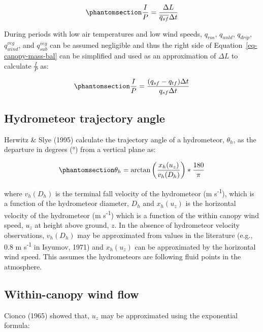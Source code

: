 \documentclass[
  letterpaper,
  DIV=11,
  numbers=noendperiod]{scrartcl}
\begin{document}
\begin{equation}\phantomsection\label{eq-ip}{
\frac{I}{P} = \frac{\Delta L}{\overline{q_{sf}} \Delta t}
}\end{equation}

During periods with low air temperatures and low wind speeds,
\(q_{ros}\), \(q_{unld}\), \(q_{drip}\), \(q_{wind}^{veg}\), and
\(q_{sub}^{veg}\) can be assumed negligible and thus the right side of
Equation~\ref{eq-canopy-mass-bal} can be simplified and used as an
approximation of \(\Delta L\) to calculate \(\frac{I}{P}\) as:

\begin{equation}\phantomsection\label{eq-ip2}{
\frac{I}{P} = \frac{(q_{sf} - q_{tf})\Delta t}{q_{sf} \Delta t}
}\end{equation}

\subsection{Hydrometeor trajectory
angle}\label{hydrometeor-trajectory-angle}

Herwitz \& Slye (1995) calculate the trajectory angle of a hydrometeor,
\(\theta_h\), as the departure in degrees (°) from a vertical plane as:

\begin{equation}\phantomsection\label{eq-ta}{
\theta_h = \arctan \left(\frac{x_h(u_z)}{v_h(D_h)}\right)*\frac{180}{\pi}
}\end{equation}

where \(v_h(D_h)\) is the terminal fall velocity of the hydrometeor (m
s\textsuperscript{-1}), which is a function of the hydrometeor diameter,
\(D_h\) and \(x_h(u_z)\) is the horizontal velocity of the hydrometeor
(m s\textsuperscript{-1}) which is a function of the within canopy wind
speed, \(u_z\) at height above ground, \(z\). In the absence of
hydrometeor velocity observations, \(v_h(D_h)\) may be approximated from
values in the literature (e.g., 0.8 m s\textsuperscript{-1} in Isyumov,
1971) and \(x_h(u_z)\) can be approximated by the horizontal wind speed.
This assumes the hydrometeors are following fluid points in the
atmosphere.

\subsection{Within-canopy wind flow}\label{within-canopy-wind-flow}

Cionco (1965) showed that, \(u_z\) may be approximated using the
exponential formula:
\end{document}
